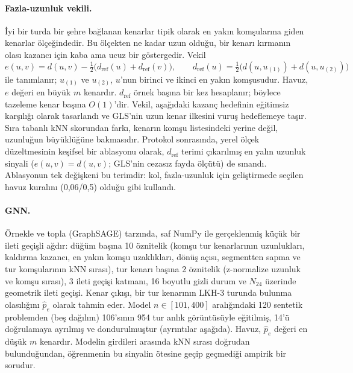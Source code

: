 \documentclass[pdflatex,sn-basic]{sn-jnl}
\begin{document}
\paragraph{Fazla-uzunluk vekili.} İyi bir turda bir şehre bağlanan kenarlar tipik olarak en yakın
komşularına giden kenarlar ölçeğindedir. Bu ölçekten ne kadar uzun olduğu, bir kenarı kırmanın
olası kazancı için kaba ama ucuz bir göstergedir. Vekil
\begin{equation}
  e(u,v)=d(u,v)-\tfrac12\bigl(d_{\mathrm{ref}}(u)+d_{\mathrm{ref}}(v)\bigr),\qquad
  d_{\mathrm{ref}}(u)=\tfrac12\bigl(d(u,u_{(1)})+d(u,u_{(2)})\bigr)
  \label{eq:excess}
\end{equation}
ile tanımlanır; $u_{(1)}$ ve $u_{(2)}$, $u$'nun birinci ve ikinci en yakın komşusudur. Havuz,
$e$ değeri en büyük $m$ kenardır. $d_{\mathrm{ref}}$ örnek başına bir kez hesaplanır; böylece
tazeleme kenar başına $O(1)$'dir. Vekil, aşağıdaki kazanç hedefinin eğitimsiz karşılığı olarak
tasarlandı ve GLS'nin uzun kenar ilkesini \citep{voudouris_1999_gls} vuruş hedeflemeye taşır. Sıra
tabanlı kNN skorundan farkı, kenarın komşu listesindeki yerine değil, uzunluğun büyüklüğüne
bakmasıdır. Protokol sonrasında, yerel ölçek düzeltmesinin keşifsel bir ablasyonu olarak,
$d_{\mathrm{ref}}$ terimi çıkarılmış en yalın uzunluk sinyali ($e(u,v)=d(u,v)$; GLS'nin cezasız
fayda ölçütü) de sınandı. Ablasyonun tek değişkeni bu terimdir: kol, fazla-uzunluk için
geliştirmede seçilen havuz kuralını (0,06/0,5) olduğu gibi kullandı.

\paragraph{GNN.} Örnekle ve topla (GraphSAGE) tarzında, saf NumPy ile gerçeklenmiş küçük bir
ileti geçişli ağdır: düğüm başına 10 öznitelik (komşu tur kenarlarının uzunlukları, kaldırma
kazancı, en yakın komşu uzaklıkları, dönüş açısı, segmentten sapma ve tur komşularının kNN
sırası), tur kenarı başına 2 öznitelik (z-normalize uzunluk ve komşu sırası), 3 ileti geçişi
katmanı, 16 boyutlu gizli durum ve $N_{24}$ üzerinde geometrik ileti geçişi. Kenar çıkışı, bir tur
kenarının LKH-3 \citep{helsgaun_2017_lkh3} turunda bulunma olasılığını $\hat p_e$ olarak tahmin eder.
Model $n\in[101,400]$ aralığındaki 120 sentetik problemden (beş dağılım) 106'sının 954 tur anlık
görüntüsüyle eğitilmiş, 14'ü doğrulamaya ayrılmış ve dondurulmuştur (ayrıntılar aşağıda). Havuz, $\hat p_e$ değeri en düşük $m$ kenardır. Modelin girdileri
arasında kNN sırası doğrudan bulunduğundan, öğrenmenin bu sinyalin ötesine geçip geçmediği ampirik
bir sorudur.
\end{document}
